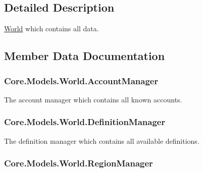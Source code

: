 \subsection{Detailed Description}
\hyperlink{classCore_1_1Models_1_1World}{World} which contains all data. 



\subsection{Member Data Documentation}
\hypertarget{classCore_1_1Models_1_1World_a9d17871a1c75acf406833c0d0e1eb4ef}{}
\subsubsection[{Account\+Manager}]{ Core.\+Models.\+World.\+Account\+Manager}\label{classCore_1_1Models_1_1World_a9d17871a1c75acf406833c0d0e1eb4ef}


The account manager which contains all known accounts. 

\hypertarget{classCore_1_1Models_1_1World_abcc61c9fa6e9d269a6e6ff1c04ddb1ca}{}
\subsubsection[{Definition\+Manager}]{ Core.\+Models.\+World.\+Definition\+Manager}\label{classCore_1_1Models_1_1World_abcc61c9fa6e9d269a6e6ff1c04ddb1ca}


The definition manager which contains all available definitions. 

\hypertarget{classCore_1_1Models_1_1World_a768e4edfe667a4f55d93a7c5dfd297ba}{}
\subsubsection[{Region\+Manager}]{ Core.\+Models.\+World.\+Region\+Manager}\label{classCore_1_1Models_1_1World_a768e4edfe667a4f55d93a7c5dfd297ba}


